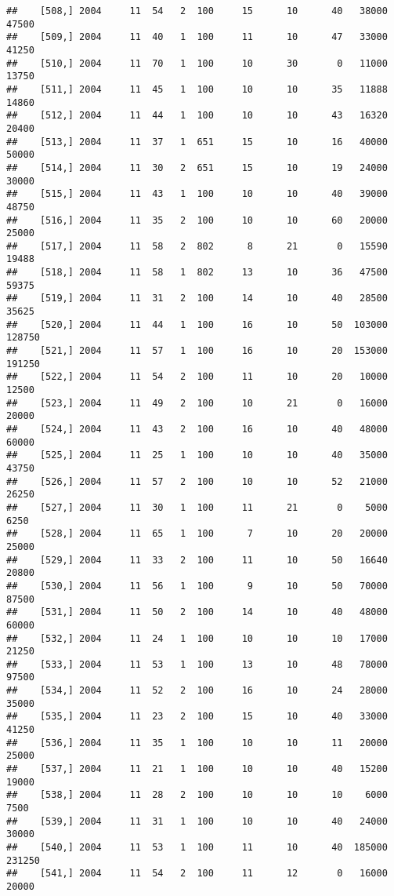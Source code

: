 \documentclass{article}\usepackage[]{graphicx}\usepackage[]{color}
\makeatletter
\newenvironment{kframe}{%
 \def\at@end@of@kframe{}%
 \ifinner\ifhmode%
  \def\at@end@of@kframe{\end{minipage}}%
  \begin{minipage}{\columnwidth}%
 \fi\fi%
 \def\FrameCommand##1{\hskip\@totalleftmargin \hskip-\fboxsep
 \colorbox{shadecolor}{##1}\hskip-\fboxsep
     \hskip-\linewidth \hskip-\@totalleftmargin \hskip\columnwidth}%
 \MakeFramed {\advance\hsize-\width
   \@totalleftmargin\z@ \linewidth\hsize
   \@setminipage}}%
 {\par\unskip\endMakeFramed%
 \at@end@of@kframe}
\newenvironment{knitrout}{}{} %
\makeatother
\begin{document}
\begin{knitrout}
\begin{kframe}
\begin{verbatim}
##    [508,] 2004     11  54   2  100     15      10      40   38000   47500
##    [509,] 2004     11  40   1  100     11      10      47   33000   41250
##    [510,] 2004     11  70   1  100     10      30       0   11000   13750
##    [511,] 2004     11  45   1  100     10      10      35   11888   14860
##    [512,] 2004     11  44   1  100     10      10      43   16320   20400
##    [513,] 2004     11  37   1  651     15      10      16   40000   50000
##    [514,] 2004     11  30   2  651     15      10      19   24000   30000
##    [515,] 2004     11  43   1  100     10      10      40   39000   48750
##    [516,] 2004     11  35   2  100     10      10      60   20000   25000
##    [517,] 2004     11  58   2  802      8      21       0   15590   19488
##    [518,] 2004     11  58   1  802     13      10      36   47500   59375
##    [519,] 2004     11  31   2  100     14      10      40   28500   35625
##    [520,] 2004     11  44   1  100     16      10      50  103000  128750
##    [521,] 2004     11  57   1  100     16      10      20  153000  191250
##    [522,] 2004     11  54   2  100     11      10      20   10000   12500
##    [523,] 2004     11  49   2  100     10      21       0   16000   20000
##    [524,] 2004     11  43   2  100     16      10      40   48000   60000
##    [525,] 2004     11  25   1  100     10      10      40   35000   43750
##    [526,] 2004     11  57   2  100     10      10      52   21000   26250
##    [527,] 2004     11  30   1  100     11      21       0    5000    6250
##    [528,] 2004     11  65   1  100      7      10      20   20000   25000
##    [529,] 2004     11  33   2  100     11      10      50   16640   20800
##    [530,] 2004     11  56   1  100      9      10      50   70000   87500
##    [531,] 2004     11  50   2  100     14      10      40   48000   60000
##    [532,] 2004     11  24   1  100     10      10      10   17000   21250
##    [533,] 2004     11  53   1  100     13      10      48   78000   97500
##    [534,] 2004     11  52   2  100     16      10      24   28000   35000
##    [535,] 2004     11  23   2  100     15      10      40   33000   41250
##    [536,] 2004     11  35   1  100     10      10      11   20000   25000
##    [537,] 2004     11  21   1  100     10      10      40   15200   19000
##    [538,] 2004     11  28   2  100     10      10      10    6000    7500
##    [539,] 2004     11  31   1  100     10      10      40   24000   30000
##    [540,] 2004     11  53   1  100     11      10      40  185000  231250
##    [541,] 2004     11  54   2  100     11      12       0   16000   20000

\end{verbatim}
\end{kframe}
\end{knitrout}
\end{document}
